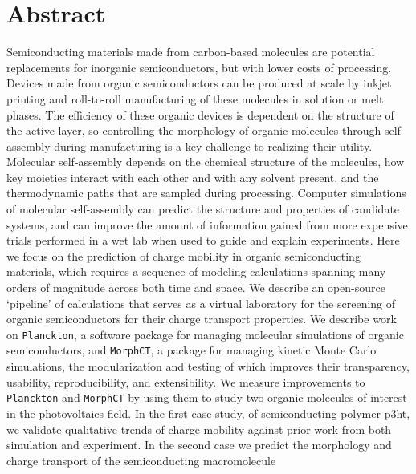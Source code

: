
\chapter*{Abstract}

Semiconducting materials made from carbon-based molecules are potential replacements for inorganic semiconductors, but with lower costs of processing.
Devices made from organic semiconductors can be produced at scale by inkjet printing and roll-to-roll manufacturing of these molecules in solution or melt phases.  
The efficiency of these organic devices is dependent on the structure of the active layer, so controlling the morphology of organic molecules through self-assembly during manufacturing is a key challenge to realizing their utility.
Molecular self-assembly depends on the chemical structure of the molecules, how key moieties interact with each other and with any solvent present, and the thermodynamic paths that are sampled during processing.
Computer simulations of molecular self-assembly can predict the structure and properties of candidate systems, and can improve the amount of information gained from more expensive trials performed in a wet lab when used to guide and explain experiments.
Here we focus on the prediction of charge mobility in organic semiconducting materials,
which requires a sequence of modeling calculations spanning many orders of magnitude across both time and space.
We describe an open-source `pipeline' of calculations that serves as a virtual laboratory for the screening of organic semiconductors for their charge transport properties.
We describe work on \texttt{Planckton}, a software package for managing molecular simulations of organic semiconductors, and \texttt{MorphCT},
a package for managing kinetic Monte Carlo simulations, the modularization and testing of which improves their transparency, usability, reproducibility, and extensibility.
We measure improvements to \texttt{Planckton} and \texttt{MorphCT} by using them to study two organic molecules of interest in the photovoltaics field.
In the first case study, of semiconducting polymer \gls{p3ht}, 
we validate qualitative trends of charge mobility against prior work from both simulation and experiment.
In the second case we predict the morphology and charge transport of the semiconducting macromolecule 
